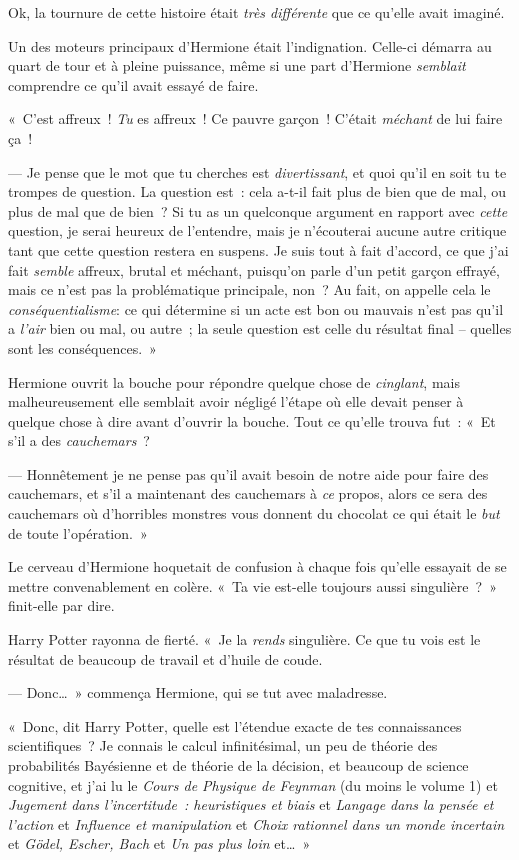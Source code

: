 Ok, la tournure de cette histoire était \emph{très différente} que ce qu'elle avait imaginé.

Un des moteurs principaux d'Hermione était l'indignation.
Celle-ci démarra au quart de tour et à pleine puissance, même si une part d'Hermione \emph{semblait} comprendre ce qu'il avait essayé de faire.

«~C'est affreux~! \emph{Tu} es affreux~! Ce pauvre garçon~! C'était \emph{méchant} de lui faire ça~!

--- Je pense que le mot que tu cherches est \emph{divertissant}, et quoi qu'il en soit tu te trompes de question.
La question est~: cela a-t-il fait plus de bien que de mal, ou plus de mal que de bien~?
Si tu as un quelconque argument en rapport avec \emph{cette} question, je serai heureux de l'entendre, mais je n'écouterai aucune autre critique tant que cette question restera en suspens.
Je suis tout à fait d'accord, ce que j'ai fait \emph{semble} affreux, brutal et méchant, puisqu'on parle d'un petit garçon effrayé, mais ce n'est pas la problématique principale, non~?
Au fait, on appelle cela le \emph{conséquentialisme}: ce qui détermine si un acte est bon ou mauvais n'est pas qu'il a \emph{l'air} bien ou mal, ou autre~; la seule question est celle du résultat final -- quelles sont les conséquences.~»

Hermione ouvrit la bouche pour répondre quelque chose de \emph{cinglant}, mais malheureusement elle semblait avoir négligé l'étape où elle devait penser à quelque chose à dire avant d'ouvrir la bouche.
Tout ce qu'elle trouva fut~:
«~Et s'il a des \emph{cauchemars}~?

--- Honnêtement je ne pense pas qu'il avait besoin de notre aide pour faire des cauchemars, et s'il a maintenant des cauchemars à \emph{ce} propos, alors ce sera des cauchemars où d'horribles monstres vous donnent du chocolat ce qui était le \emph{but} de toute l'opération.~»

Le cerveau d'Hermione hoquetait de confusion à chaque fois qu'elle essayait de se mettre convenablement en colère.
«~Ta vie est-elle toujours aussi singulière~?~» finit-elle par dire.

Harry Potter rayonna de fierté.
«~Je la \emph{rends} singulière. Ce que tu vois est le résultat de beaucoup de travail et d'huile de coude.

--- Donc…~» commença Hermione, qui se tut avec maladresse.

«~Donc, dit Harry Potter, quelle est l'étendue exacte de tes connaissances scientifiques~?
Je connais le calcul infinitésimal, un peu de théorie des probabilités Bayésienne et de théorie de la décision, et beaucoup de science cognitive, et j'ai lu le \emph{Cours de Physique de Feynman} (du moins le volume 1) et \emph{Jugement dans l'incertitude~: heuristiques et biais} et \emph{Langage dans la pensée et l'action} et \emph{Influence et manipulation} et \emph{Choix rationnel dans un monde incertain} et \emph{Gödel, Escher, Bach} et \emph{Un pas plus loin} et…~»

